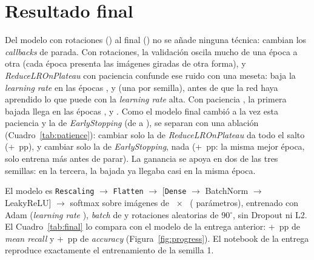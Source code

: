 \section{Resultado final}\label{sec:final}
Del modelo con rotaciones () al final () no se añade ninguna
técnica: cambian los \emph{callbacks} de parada. Con rotaciones, la validación oscila mucho de una época a otra (cada
época presenta las imágenes giradas de otra forma), y \emph{ReduceLROnPlateau} con paciencia 
confunde ese ruido con una meseta: baja la \emph{learning rate} en las épocas ,
 y  (una por semilla), antes de que la red haya aprendido lo que puede con la
\emph{learning rate} alta. Con paciencia , la primera bajada llega en las épocas
,  y . Como el modelo final cambió a la vez esta paciencia y
la de \emph{EarlyStopping} (de  a ), se separan con una ablación
(Cuadro~\ref{tab:patience}): cambiar solo la de \emph{ReduceLROnPlateau} da todo el salto (+~pp), y
cambiar solo la de \emph{EarlyStopping}, nada (+~pp: la misma mejor época, solo entrena más antes de
parar). La ganancia se apoya en dos de las tres semillas: en la tercera, la bajada ya llegaba casi en la misma época.

El modelo es \texttt{Rescaling} $\rightarrow$ \texttt{Flatten} $\rightarrow$
 [\texttt{Dense} $\rightarrow$ BatchNorm $\rightarrow$ LeakyReLU] $\rightarrow$ softmax sobre
imágenes de ~$\times$~ ( parámetros), entrenado con Adam
(\emph{learning rate} ), \emph{batch} de  y rotaciones aleatorias de 90$^\circ$, sin
Dropout ni L2. El Cuadro~\ref{tab:final} lo compara con el modelo de la entrega anterior: +~pp de
\emph{mean recall} y +~pp de \emph{accuracy} (Figura~\ref{fig:progress}). El notebook de la
entrega reproduce exactamente el entrenamiento de la semilla 1.

\begin{table}[h]
  \centering
  \caption{Ablación de los \emph{callbacks} sobre el modelo con rotaciones ( semillas por fila):
  paciencias de \emph{EarlyStopping} y de \emph{ReduceLROnPlateau}.}
  \label{tab:patience}
\end{table}

